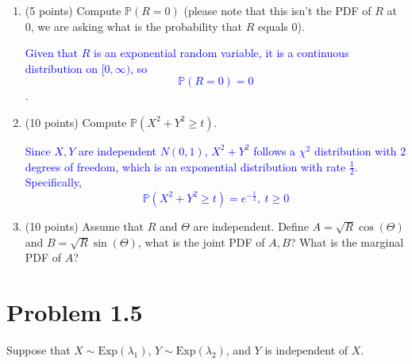 \documentclass{article}
\begin{document}
\begin{enumerate}[label=(\alph*)]
    \item (5 points) Compute $\mathbb{P}(R = 0)$ (please note that this isn’t the PDF of $R$ at 0, we are asking what is the probability that $R$ equals 0).
    
        \textcolor{blue}{Given that $R$ is an exponential random variable, it is a continuous distribution on $[0,\infty)$, so $$\mathbb{P}(R=0)=0$$.}

    \item (10 points) Compute $\mathbb{P}(X^2 + Y^2 \geq t)$.

        \textcolor{blue}{Since $X,Y$ are independent $N(0,1)$, $X^2+Y^2$ follows a $\chi^2$ distribution with 2 degrees of freedom, which is an exponential distribution with rate $\frac{1}{2}$. Specifically, 
        $$\mathbb{P}(X^2+Y^2 \geq t)=e^{-\frac{t}{2}}, \ t \geq 0$$}

    \item (10 points) Assume that $R$ and $\Theta$ are independent. Define $A = \sqrt{R}\cos(\Theta)$ and $B = \sqrt{R}\sin(\Theta)$, what is the joint PDF of $A, B$? What is the marginal PDF of $A$?

    \textcolor{blue}{}

\end{enumerate}

\section*{Problem 1.5}
Suppose that $X \sim \text{Exp}(\lambda_1)$, $Y \sim \text{Exp}(\lambda_2)$, and $Y$ is independent of $X$.
\end{document}
